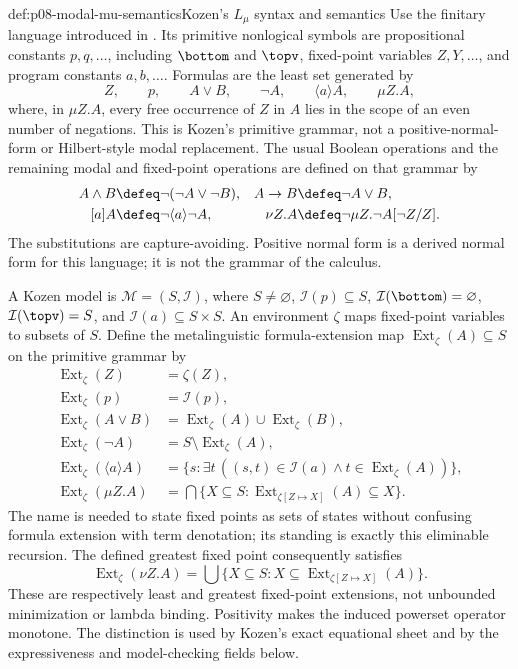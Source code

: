 \begin{hbdefinition}{def:p08-modal-mu-semantics}{Kozen's \(L_{\mu}\) syntax and semantics}
Use the finitary language introduced in \textcite{Kozen1983}.  Its primitive
nonlogical symbols are propositional constants \(p,q,\ldots\), including
\(\bottom\) and \(\topv\), fixed-point variables \(Z,Y,\ldots\), and program
constants \(a,b,\ldots\).  Formulas are the least set generated by
\[
 Z,\qquad p,\qquad A\lor B,\qquad \neg A,\qquad
 \langle a\rangle A,\qquad \mu Z.A,
\]
where, in \(\mu Z.A\), every free occurrence of \(Z\) in \(A\) lies in the
scope of an even number of negations.  This is Kozen's primitive grammar, not
a positive-normal-form or Hilbert-style modal replacement.  The
usual Boolean operations and the remaining modal and fixed-point operations
are defined on that grammar by
\[
 \begin{aligned}
 A\land B&\defeq\neg(\neg A\lor\neg B),
 & A\to B&\defeq\neg A\lor B,\\
 [a]A&\defeq\neg\langle a\rangle\neg A,
 & \nu Z.A&\defeq\neg\mu Z.\neg A[\neg Z/Z].
 \end{aligned}
\]
The substitutions are capture-avoiding.  Positive normal form is a derived
normal form for this language; it is not the grammar of the calculus.

A Kozen model is \(\mathcal M=(S,\mathcal I)\), where \(S\ne\varnothing\),
\(\mathcal I(p)\subseteq S\), \(\mathcal I(\bottom)=\varnothing\),
\(\mathcal I(\topv)=S\), and
\(\mathcal I(a)\subseteq S\times S\).  An environment \(\zeta\) maps
fixed-point variables to subsets of \(S\).  Define the metalinguistic
formula-extension map \(\operatorname{Ext}_{\zeta}(A)\subseteq S\) on the
primitive grammar by
\[
\begin{aligned}
 \operatorname{Ext}_{\zeta}(Z)&=\zeta(Z),\\
 \operatorname{Ext}_{\zeta}(p)&=\mathcal I(p),\\
 \operatorname{Ext}_{\zeta}(A\lor B)&=
   \operatorname{Ext}_{\zeta}(A)\cup\operatorname{Ext}_{\zeta}(B),\\
 \operatorname{Ext}_{\zeta}(\neg A)&=
   S\setminus\operatorname{Ext}_{\zeta}(A),\\
 \operatorname{Ext}_{\zeta}(\langle a\rangle A)&=
   \{s:\exists t\,((s,t)\in\mathcal I(a)\land
      t\in\operatorname{Ext}_{\zeta}(A))\},\\
 \operatorname{Ext}_{\zeta}(\mu Z.A)
 &=\bigcap\{X\subseteq S:
     \operatorname{Ext}_{\zeta[Z\mapsto X]}(A)\subseteq X\}.
\end{aligned}
\]
The name is needed to state fixed points as sets of states without confusing
formula extension with term denotation; its standing is exactly this
eliminable recursion.  The defined greatest fixed point consequently satisfies
\[
 \operatorname{Ext}_{\zeta}(\nu Z.A)
 =\bigcup\{X\subseteq S:
    X\subseteq\operatorname{Ext}_{\zeta[Z\mapsto X]}(A)\}.
\]
These are respectively least and greatest fixed-point extensions, not
unbounded minimization or lambda binding.  Positivity makes the induced
powerset operator monotone.  The distinction is used by Kozen's exact
equational sheet and by the expressiveness and model-checking fields below.
\end{hbdefinition}

